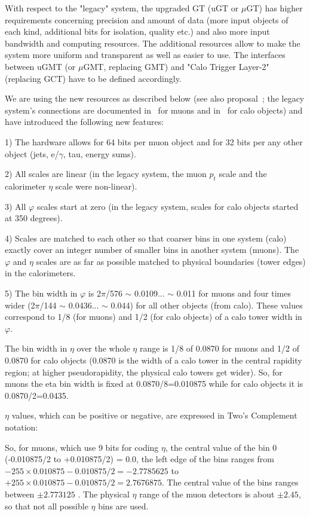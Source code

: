 \documentclass{cmspaper}
\begin{document}
With respect to the "legacy" system, the upgraded GT (uGT or $\mu$GT) has higher requirements concerning precision and amount of data (more input objects of each kind, additional bits for isolation, quality etc.) and also more input bandwidth and computing resources. The additional resources  allow to make the system more uniform and transparent as well as easier to use. The interfaces between uGMT (or $\mu$GMT, replacing GMT) and "Calo Trigger Layer-2" (replacing GCT) have to be defined accordingly.

We are using the new resources as described below (see also proposal~\cite{Darin}; the legacy system's connections are documented in~\cite{muon} for muons and in~\cite{calo} for calo objects) and have introduced the following new features:

1) The hardware  allows for 64 bits per muon object and for 32 bits per any other object (jets, e/$\gamma$, tau, energy sums).

2) All scales are linear (in the legacy system, the muon $p_t$ scale and the calorimeter $\eta$ scale were non-linear).

3) All $\varphi$ scales start at zero (in the legacy system, scales for calo objects started at 350 degrees).

4) Scales are matched to each other so that coarser bins in one system (calo) exactly cover an integer number of smaller bins in another system (muons). The $\varphi$ and $\eta$ scales are as far as possible matched to physical boundaries (tower edges) in the calorimeters.

5) The bin width in  $\varphi$  is 2$\pi$/576 $\sim$ 0.0109... $\sim$ 0.011 for muons and four times wider (2$\pi$/144 $\sim$ 0.0436... $\sim$ 0.044) for all other objects (from calo). These values correspond to 1/8 (for muons) and 1/2 (for calo objects) of a calo tower width in $\varphi$.

The bin width in $\eta$ over the whole $\eta$ range is 1/8 of 0.0870 for muons and 1/2 of 0.0870 for calo objects (0.0870 is the width of a calo tower  in the central rapidity region; at higher pseudorapidity, the physical calo towers get wider). So, for muons the eta bin width is fixed at 0.0870/8=0.010875 while for calo objects it is 0.0870/2=0.0435.

$\eta$ values, which can be positive or negative, are expressed in Two's Complement notation:

So, for muons, which use 9 bits for coding $\eta$, the central value of the bin 0 (-0.010875/2 to +0.010875/2) = 0.0, the left edge of the bins ranges from $-255 \times 0.010875 - 0.010875/2 = -2.7785625$ to $+255 \times 0.010875 - 0.010875/2 = 2.7676875$. The central value of the bins ranges between $\pm 2.773125$ .  The physical $\eta$ range of the muon detectors is about $\pm2.45$, so that not all possible $\eta$ bins are used.
\end{document}

